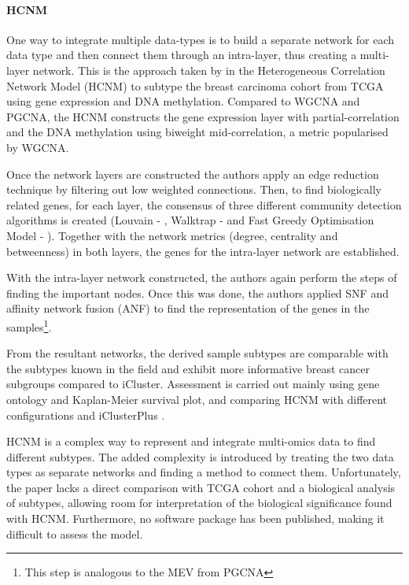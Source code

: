 \paragraph*{HCNM} \label{s:lit:HCNM}

One way to integrate multiple data-types is to build a separate network for each data type and then connect them through an intra-layer, thus creating a multi-layer network. This is the approach taken by \citet{Vangimalla2021-fc} in the Heterogeneous Correlation Network Model (HCNM) to subtype the breast carcinoma cohort from TCGA using gene expression and DNA methylation. Compared to WGCNA and PGCNA, the HCNM constructs the gene expression layer with partial-correlation and the DNA methylation using biweight mid-correlation, a metric popularised by WGCNA. 

Once the network layers are constructed the authors apply an edge reduction technique by filtering out low weighted connections. Then, to find biologically related genes, for each layer, the consensus of three different community detection algorithms is created (Louvain - \citet{Blondel2008-ik}, Walktrap - \citet{Pons2005-oa} and Fast Greedy Optimisation Model - \cite{Clauset2004-em}). Together with the network metrics (degree, centrality and betweenness) in both layers, the genes for the intra-layer network are established.

With the intra-layer network constructed, the authors again perform the steps of finding the important nodes. Once this was done, the authors applied SNF and affinity network fusion (ANF) to find the representation of the genes in the samples\footnote{This step is analogous to the MEV from PGCNA}. 

From the resultant networks, the derived sample subtypes are comparable with the subtypes known in the field and exhibit more informative breast cancer subgroups compared to iCluster. Assessment is carried out mainly using gene ontology and Kaplan-Meier survival plot, and comparing HCNM with different configurations and iClusterPlus \citep{Mo2013-zi}. 

HCNM is a complex way to represent and integrate multi-omics data to find different subtypes. The added complexity is introduced by treating the two data types as separate networks and finding a method to connect them. Unfortunately, the paper lacks a direct comparison with TCGA cohort and a biological analysis of subtypes, allowing room for interpretation of the biological significance found with HCNM. Furthermore, no software package has been published, making it difficult to assess the model. 

